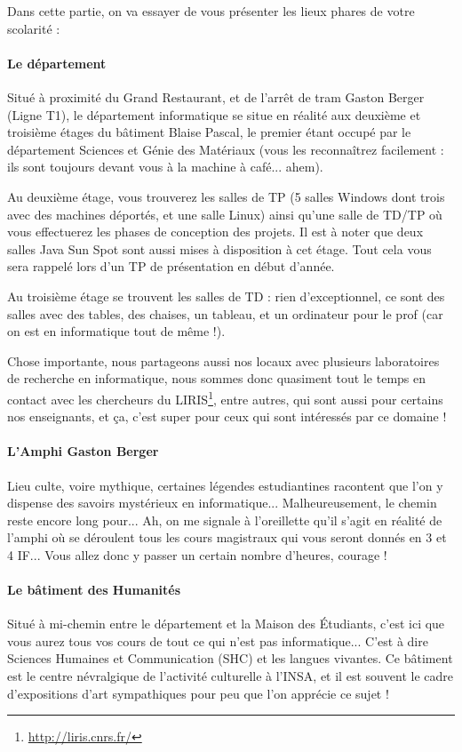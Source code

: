 Dans cette partie, on va essayer de vous présenter les lieux phares de votre scolarité : 

\paragraph{Le département}
Situé à proximité du Grand Restaurant, et de l'arrêt de tram Gaston Berger
(Ligne T1), le département informatique se situe en réalité aux deuxième et
troisième étages du bâtiment Blaise Pascal, le premier étant occupé par le
département Sciences et Génie des Matériaux (vous les reconnaîtrez facilement :
ils sont toujours devant vous à la machine à café... ahem).

Au deuxième étage, vous trouverez les salles de TP (5 salles Windows dont trois
avec des machines déportés, et une salle Linux) ainsi qu'une salle de
TD/TP où vous effectuerez les phases de conception des projets. Il est à noter que deux
salles Java Sun Spot sont aussi mises à disposition à cet étage. Tout
cela vous sera rappelé lors d'un TP de présentation en début d'année.

Au troisième étage se trouvent les salles de TD : rien d'exceptionnel, ce sont
des salles avec des tables, des chaises, un tableau, et un ordinateur pour le
prof (car on est en informatique tout de même !). 

Chose importante, nous partageons aussi nos locaux avec plusieurs laboratoires
de recherche en informatique, nous sommes donc quasiment tout le temps en
contact avec les chercheurs du LIRIS\footnote{\url{http://liris.cnrs.fr/}}, entre autres, qui sont aussi pour certains
nos enseignants, et ça, c'est super pour ceux qui sont intéressés par ce domaine !

\paragraph{L'Amphi Gaston Berger}
Lieu culte, voire mythique, certaines légendes estudiantines racontent que l'on
y dispense des savoirs mystérieux en informatique... Malheureusement, le chemin reste
encore long pour... Ah, on me signale à l'oreillette qu'il s'agit en réalité de l'amphi où se
déroulent tous les cours magistraux qui vous seront donnés en 3 et 4 IF... Vous
allez donc y passer un certain nombre d'heures, courage ! 

\paragraph{Le bâtiment des Humanités}
Situé à mi-chemin entre le département et la Maison des Étudiants, c'est ici
que vous aurez tous vos cours de tout ce qui n'est pas informatique... C'est à
dire Sciences Humaines et Communication (SHC) et les langues vivantes. 
Ce bâtiment est le centre névralgique de l'activité culturelle à l'INSA, et il
est souvent le cadre d'expositions d'art sympathiques pour peu que l'on apprécie ce sujet !

